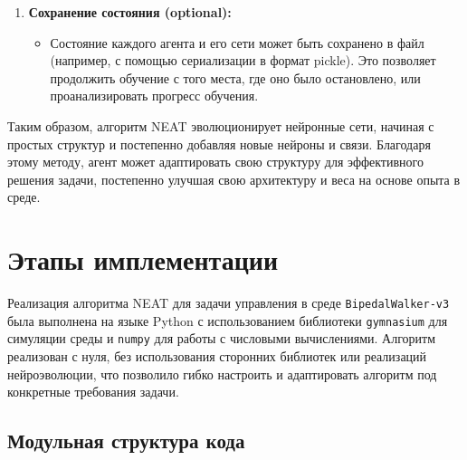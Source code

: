 \documentclass[a4paper,12pt]{article}
\begin{document}
\begin{enumerate}
    \item \textbf{Сохранение состояния (optional):}
    \begin{itemize}
        \item Состояние каждого агента и его сети может быть сохранено в файл (например, с помощью сериализации в формат pickle). Это позволяет продолжить обучение с того места, где оно было остановлено, или проанализировать прогресс обучения.
    \end{itemize}
\end{enumerate}

Таким образом, алгоритм NEAT эволюционирует нейронные сети, начиная с простых структур и постепенно добавляя новые нейроны и связи. Благодаря этому методу, агент может адаптировать свою структуру для эффективного решения задачи, постепенно улучшая свою архитектуру и веса на основе опыта в среде.
\newpage
\section{Этапы имплементации}

Реализация алгоритма NEAT для задачи управления в среде \texttt{BipedalWalker-v3} была выполнена на языке Python с использованием библиотеки \texttt{gymnasium} для симуляции среды и \texttt{numpy} для работы с числовыми вычислениями. Алгоритм реализован с нуля, без использования сторонних библиотек или реализаций нейроэволюции, что позволило гибко настроить и адаптировать алгоритм под конкретные требования задачи.

\subsection{Модульная структура кода}
\end{document}
